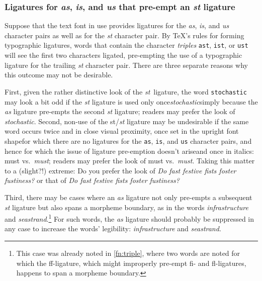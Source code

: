 \documentclass[12pt]{article}
\newcommand{\opt}[1]{\texttt{#1}}
\begin{document}
\subsubsection{Ligatures for \emph{as}, \emph{is}, and \emph{us} that pre-empt an \emph{st} ligature}

Suppose that the text font in use provides ligatures for the \emph{as}, \emph{is}, and \emph{us} character pairs as well as for the \emph{st} character pair. By \TeX's rules for forming typographic ligatures, words that contain the character \emph{triples} \opt{ast}, \opt{ist}, or \opt{ust} will see the first two characters ligated, pre-empting the use of a typographic ligature for the trailing \emph{st} character pair. There are three separate reasons why this outcome may not be desirable.

First, given the rather distinctive look of the \emph{st}~ligature, the word \opt{stochastic} may look a bit odd if the \emph{st} ligature is used only once\textemdash\emph{stoch\mbox{as}tic}\textemdash simply because the \emph{as} ligature pre-empts the second \emph{st} ligature; readers may prefer the look of \emph{stocha\mbox{st}ic}. Second, non-use of the st/\emph{st} ligature may be undesirable if the same word occurs twice and in close visual proximity, once set in the upright font shape\textemdash for which there are no ligatures for the \opt{as}, \opt{is}, and \opt{us} character pairs, and hence for which the issue of ligature pre-emption doesn't arise\textemdash and once in italics: must vs.\ \emph{m\mbox{us}t}; readers may prefer the look of must vs.\ \emph{mu\mbox{st}}. Taking this matter to a (slight?!) extreme: Do you prefer the look of \emph{Do f\mbox{as}t festive f\mbox{is}ts foster f\mbox{us}tiness?} or that of \emph{Do fa\mbox{st} festive fi\mbox{st}s foster fu\mbox{st}iness?}

Third, there may be cases where an \emph{as} ligature not only pre-empts a subsequent \emph{st} ligature but also spans a morpheme boundary, as in the words \emph{infr\mbox{as}tructure} and \emph{se\mbox{as}trand}.\footnote{This case was already noted in \cref{fn:triple}, where two words are noted for which the ff-ligature, which might improperly pre-empt fi- and fl-ligatures, happens to span a morpheme boundary.} For such words, the \emph{as} ligature should probably be suppressed in any case to increase the words' legibility: \emph{infra\mbox{st}ructure} and \emph{sea\mbox{st}rand}.
\end{document}
